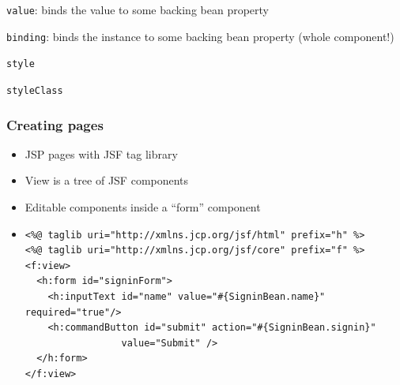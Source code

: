 \documentclass[10pt,xcolor=pdflatex]{beamer}
\begin{document}
\begin{frame}
\begin{itemize}
\begin{itemize}
\begin{footnotesize}
              \item \texttt{value}: binds the value to some backing bean property
              \item \texttt{binding}: binds the instance to some backing bean property (whole component!)
              \item \texttt{style}
              \item \texttt{styleClass}
        	\end{footnotesize}
          \end{itemize}
	\end{itemize}
\end{frame}


\begin{frame}[fragile]\frametitle{Creating pages}
    \begin{itemize}
      	\item JSP pages with JSF tag library
      	\item View is a tree of JSF components
      	\item Editable components inside a ``form'' component
        \item[]
        	\medskip
            \begin{Verbatim}[fontsize=\scriptsize, commandchars=\\\{\}]
<%@ taglib uri="http://xmlns.jcp.org/jsf/html" prefix="h" %>
<%@ taglib uri="http://xmlns.jcp.org/jsf/core" prefix="f" %>
<f:view>
  <h:form id="signinForm">
    <h:inputText id="name" value="#{SigninBean.name}" required="true"/>
    <h:commandButton id="submit" action="#{SigninBean.signin}"
    	         value="Submit" />
  </h:form>
</f:view>           
            \end{Verbatim}
    \end{itemize}
\end{frame}
\end{document}
